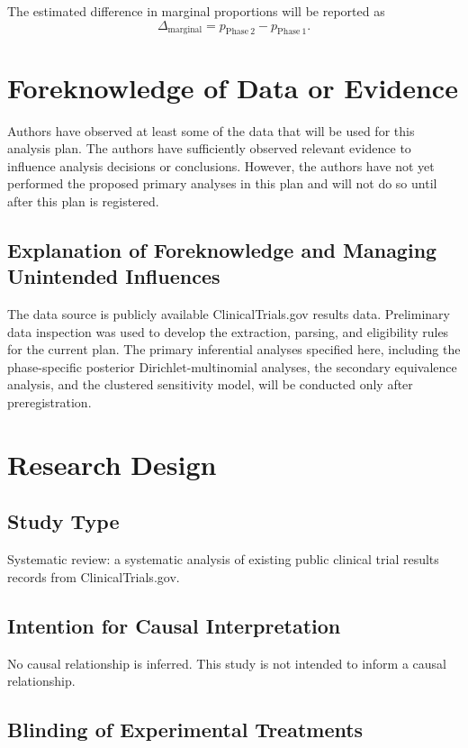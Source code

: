 \documentclass[11pt]{article}
\begin{document}
The estimated difference in marginal proportions will be reported as
\[
\Delta_{\mathrm{marginal}} =
p_{\mathrm{Phase\ 2}} - p_{\mathrm{Phase\ 1}}.
\]

\section{Foreknowledge of Data or Evidence}

Authors have observed at least some of the data that will be used for this analysis plan. The authors have sufficiently observed relevant evidence to influence analysis decisions or conclusions. However, the authors have not yet performed the proposed primary analyses in this plan and will not do so until after this plan is registered.

\subsection{Explanation of Foreknowledge and Managing Unintended Influences}

The data source is publicly available ClinicalTrials.gov results data. Preliminary data inspection was used to develop the extraction, parsing, and eligibility rules for the current plan. The primary inferential analyses specified here, including the phase-specific posterior Dirichlet-multinomial analyses, the secondary equivalence analysis, and the clustered sensitivity model, will be conducted only after preregistration.

\section{Research Design}

\subsection{Study Type}

Systematic review: a systematic analysis of existing public clinical trial results records from ClinicalTrials.gov.

\subsection{Intention for Causal Interpretation}

No causal relationship is inferred. This study is not intended to inform a causal relationship.

\subsection{Blinding of Experimental Treatments}
\end{document}
